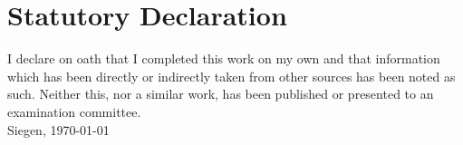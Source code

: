 \chapter*{Statutory Declaration}
I declare on oath that I completed this work on my own and that information which has been directly
or indirectly taken from other sources has been noted as such. Neither this, nor a similar work, has
been published or presented to an examination committee.\\

Siegen, \today  \hspace*{5cm} \hrulefill
